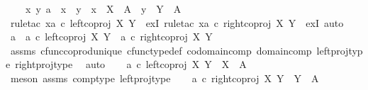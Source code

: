 \begin{isabellebody}
\ \ \ {\isachardoublequoteopen}{\isasymexists}\ x\ y{\isachardot}{\kern0pt}\ a\ {\isacharequal}{\kern0pt}\ {\isacharparenleft}{\kern0pt}x\ {\isasymamalg}\ y{\isacharparenright}{\kern0pt}\ {\isasymand}\ x\ {\isacharcolon}{\kern0pt}\ X\ {\isasymrightarrow}\ A\ {\isasymand}\ y\ {\isacharcolon}{\kern0pt}\ Y\ {\isasymrightarrow}\ A{\isachardoublequoteclose}\isanewline
%
\isadelimproof
%
\endisadelimproof
%
\isatagproof
{}\isamarkupfalse%
\ {\isacharparenleft}{\kern0pt}rule{\isacharunderscore}{\kern0pt}tac\ x{\isacharequal}{\kern0pt}{\isachardoublequoteopen}a\ {\isasymcirc}\isactrlsub c\ left{\isacharunderscore}{\kern0pt}coproj\ X\ Y{\isachardoublequoteclose}\ \ exI{\isacharcomma}{\kern0pt}\ rule{\isacharunderscore}{\kern0pt}tac\ x{\isacharequal}{\kern0pt}{\isachardoublequoteopen}a\ {\isasymcirc}\isactrlsub c\ right{\isacharunderscore}{\kern0pt}coproj\ X\ Y{\isachardoublequoteclose}\ \ exI{\isacharcomma}{\kern0pt}\ auto{\isacharparenright}{\kern0pt}\isanewline
\ \ \isamarkupfalse%
\ {\isachardoublequoteopen}a\ {\isacharequal}{\kern0pt}\ {\isacharparenleft}{\kern0pt}a\ {\isasymcirc}\isactrlsub c\ left{\isacharunderscore}{\kern0pt}coproj\ X\ Y{\isacharparenright}{\kern0pt}\ {\isasymamalg}\ {\isacharparenleft}{\kern0pt}a\ {\isasymcirc}\isactrlsub c\ right{\isacharunderscore}{\kern0pt}coproj\ X\ Y{\isacharparenright}{\kern0pt}{\isachardoublequoteclose}\isanewline
\ \ \ \ \isamarkupfalse%
\ assms\ cfunc{\isacharunderscore}{\kern0pt}coprod{\isacharunderscore}{\kern0pt}unique\ cfunc{\isacharunderscore}{\kern0pt}type{\isacharunderscore}{\kern0pt}def\ codomain{\isacharunderscore}{\kern0pt}comp\ domain{\isacharunderscore}{\kern0pt}comp\ left{\isacharunderscore}{\kern0pt}proj{\isacharunderscore}{\kern0pt}type\ right{\isacharunderscore}{\kern0pt}proj{\isacharunderscore}{\kern0pt}type\ \isamarkupfalse%
\ auto\isanewline
\ \ \isamarkupfalse%
\ {\isachardoublequoteopen}a\ {\isasymcirc}\isactrlsub c\ left{\isacharunderscore}{\kern0pt}coproj\ X\ Y\ {\isacharcolon}{\kern0pt}\ X\ {\isasymrightarrow}\ A{\isachardoublequoteclose}\isanewline
\ \ \ \ \isamarkupfalse%
\ {\isacharparenleft}{\kern0pt}meson\ assms\ comp{\isacharunderscore}{\kern0pt}type\ left{\isacharunderscore}{\kern0pt}proj{\isacharunderscore}{\kern0pt}type{\isacharparenright}{\kern0pt}\isanewline
\ \ \isamarkupfalse%
\ {\isachardoublequoteopen}a\ {\isasymcirc}\isactrlsub c\ right{\isacharunderscore}{\kern0pt}coproj\ X\ Y\ {\isacharcolon}{\kern0pt}\ Y\ {\isasymrightarrow}\ A{\isachardoublequoteclose}\isanewline

\end{isabellebody}
